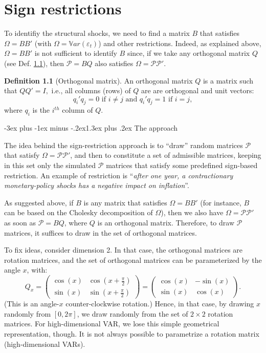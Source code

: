\documentclass[
  11pt,
]{book}
\makeatletter
\renewcommand\section{\@startsection{section}{1}{\z@}
  {-3ex plus -1ex minus -.2ex}{1.3ex plus .2ex}
  {\normalfont\Large\bfseries\color{TextbookInk}}}
\theoremstyle{definition}
\newtheorem{definition}{Definition}[chapter]
\theoremstyle{definition}
\theoremstyle{definition}
\theoremstyle{definition}
\theoremstyle{remark}
\makeatother
\begin{document}
\chapter{Sign restrictions}\label{Signs}

To identifiy the structural shocks, we need to find a matrix \(B\) that satisfies \(\Omega = BB'\) (with \(\Omega = \mathbb{V}ar(\varepsilon_t)\)) and other restrictions. Indeed, as explained above, \(\Omega = BB'\) is not sufficient to identify \(B\) since, if we take any orthogonal matrix \(Q\) (see Def. \ref{def:orthogonal}), then \(\mathcal{P}=BQ\) also satisfies \(\Omega = \mathcal{P}\mathcal{P}'\).

\begin{definition}[Orthogonal matrix]
\protect\hypertarget{def:orthogonal}{}\label{def:orthogonal}An orthogonal matrix \(Q\) is a matrix such that \(QQ' = I,\) i.e., all columns (rows) of \(Q\) are are
orthogonal and unit vectors:
\[q_i'q_j=0\text{ if }i\neq j\text{ and }q_i'q_j=1\text{ if }i= j,\]
where \(q_i\) is the \(i^{th}\) column of \(Q\).
\end{definition}

\section{The approach}\label{the-approach}

The idea behind the sign-restriction approach is to ``draw'' random matrices \(\mathcal{P}\) that satisfy \(\Omega = \mathcal{P}\mathcal{P}'\), and then to constitute a set of admissible matrices, keeping in this set only the simulated \(\mathcal{P}\) matrices that satisfy some predefined sign-based restriction. An example of restriction is ``\emph{after one year, a contractionary monetary-policy shocks has a negative impact on inflation}''.

As suggested above, if \(B\) is any matrix that satisfies \(\Omega = BB'\) (for instance, \(B\) can be based on the Cholesky decomposition of \(\Omega\)), then we also have \(\Omega = \mathcal{P}\mathcal{P}'\) as soon as \(\mathcal{P}=BQ\), where \(Q\) is an orthogonal matrix. Therefore, to draw \(\mathcal{P}\) matrices, it suffices to draw in the set of orthogonal matrices.

To fix ideas, consider dimension 2. In that case, the orthogonal matrices are rotation matrices, and the set of orthogonal matrices can be parameterized by the angle \(x\), with:
\[
Q_x=\begin{pmatrix}\cos(x)&\cos\left(x+\frac{\pi}{2}\right)\\
\sin(x)&\sin\left(x+\frac{\pi}{2}\right)\end{pmatrix}=\begin{pmatrix}\cos(x)&-\sin(x)\\
\sin(x)&\cos(x)\end{pmatrix}.
\]
(This is an angle-\(x\) counter-clockwise rotation.) Hence, in that case, by drawing \(x\) randomly from \([0,2\pi]\), we draw randomly from the set of \(2\times2\) rotation matrices. For high-dimensional VAR, we lose this simple geometrical representation, though. It is not always possible to parametrize a rotation matrix (high-dimensional VARs).
\end{document}
